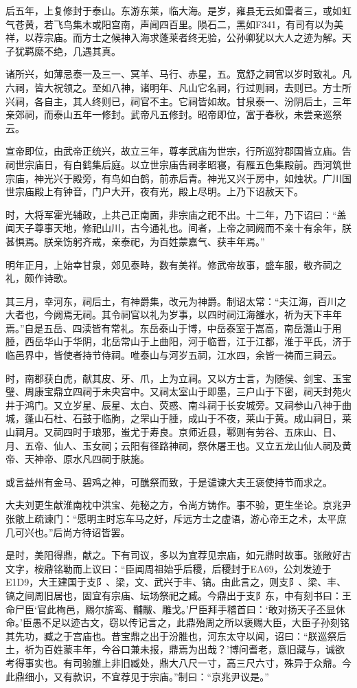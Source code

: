 \documentclass[]{article}
\begin{document}
后五年，上复修封于泰山。东游东莱，临大海。是岁，雍县无云如雷者三，或如虹气苍黄，若飞鸟集木或阳宫南，声闻四百里。陨石二，黑如F341，有司有以为美祥，以荐宗庙。而方士之候神入海求蓬莱者终无验，公孙卿犹以大人之迹为解。天子犹羁縻不绝，几遇其真。

诸所兴，如薄忌泰一及三一、冥羊、马行、赤星，五。宽舒之祠官以岁时致礼。凡六祠，皆大祝领之。至如八神，诸明年、凡山它名祠，行过则祠，去则已。方士所兴祠，各自主，其人终则已，祠官不主。它祠皆如故。甘泉泰一、汾阴后土，三年亲郊祠，而泰山五年一修封。武帝凡五修封。昭帝即位，富于春秋，未尝亲巡祭云。

宣帝即位，由武帝正统兴，故立三年，尊孝武庙为世宗，行所巡狩郡国皆立庙。告祠世宗庙日，有白鹤集后庭。以立世宗庙告祠孝昭寝，有雁五色集殿前。西河筑世宗庙，神光兴于殿旁，有鸟如白鹤，前赤后青。神光又兴于房中，如烛状。广川国世宗庙殿上有钟音，门户大开，夜有光，殿上尽明。上乃下诏赦天下。

时，大将军霍光辅政，上共己正南面，非宗庙之祀不出。十二年，乃下诏曰：``盖闻天子尊事天地，修祀山川，古今通礼也。间者，上帝之祠阙而不亲十有余年，朕甚惧焉。朕亲饬躬齐戒，亲泰祀，为百姓蒙嘉气、获丰年焉。''

明年正月，上始幸甘泉，郊见泰畤，数有美祥。修武帝故事，盛车服，敬齐祠之礼，颇作诗歌。

其三月，幸河东，祠后土，有神爵集，改元为神爵。制诏太常：``夫江海，百川之大者也，今阙焉无祠。其令祠官以礼为岁事，以四时祠江海雒水，祈为天下丰年焉。''自是五岳、四渎皆有常礼。东岳泰山于博，中岳泰室于嵩高，南岳灊山于用腄，西岳华山于华阴，北岳常山于上曲阳，河于临晋，江于江都，淮于平氏，济于临邑界中，皆使者持节侍祠。唯泰山与河岁五祠，江水四，余皆一祷而三祠云。

时，南郡获白虎，献其皮、牙、爪，上为立祠。又以方士言，为随侯、剑宝、玉宝璧、周康宝鼎立四祠于未央宫中。又祠太室山于即墨，三户山于下密，祠天封苑火井于鸿门。又立岁星、辰星、太白、荧惑、南斗祠于长安城旁。又祠参山八神于曲城，蓬山石杜、石鼓于临朐，之罘山于腄，成山于不夜，莱山于黄。成山祠日，莱山祠月。又祠四时于琅邪，蚩尤于寿良。京师近县，鄠则有劳谷、五床山、日、月、五帝、仙人、玉女祠；云阳有径路神祠，祭休屠王也。又立五龙山仙人祠及黄帝、天神帝、原水凡四祠于肤施。

或言益州有金马、碧鸡之神，可醮祭而致，于是谴谏大夫王褒使持节而求之。

大夫刘更生献淮南枕中洪宝、苑秘之方，令尚方铸作。事不验，更生坐论。京兆尹张敞上疏谏门：``愿明主时忘车马之好，斥远方士之虚语，游心帝王之术，太平庶几可兴也。''后尚方待诏皆罢。

是时，美阳得鼎，献之。下有司议，多以为宜荐见宗庙，如元鼎时故事。张敞好古文字，桉鼎铭勒而上议曰：``臣闻周祖始乎后稷，后稷封于EA69，公刘发迹于E1D9，大王建国于支阝、梁，文、武兴于丰、镐。由此言之，则支阝、梁、丰、镐之间周旧居也，固宜有宗庙、坛场祭祀之臧。今鼎出于支阝东，中有刻书曰：王命尸臣`官此栒邑，赐尔旂鸾、黼黻、雕戈。'尸臣拜手稽首曰：`敢对扬天子丕显休命。'臣愚不足以迹古文，窃以传记言之，此鼎殆周之所以褒赐大臣，大臣子孙刻铭其先功，臧之于宫庙也。昔宝鼎之出于汾脽也，河东太守以闻，诏曰：``朕巡祭后土，祈为百姓蒙丰年，今谷口兼未报，鼎焉为出哉？'博问耆老，意旧藏与，诚欲考得事实也。有司验脽上非旧臧处，鼎大八尺一寸，高三尺六寸，殊异于众鼎。今此鼎细小，又有款识，不宜荐见于宗庙。''制曰：``京兆尹议是。''
\end{document}
